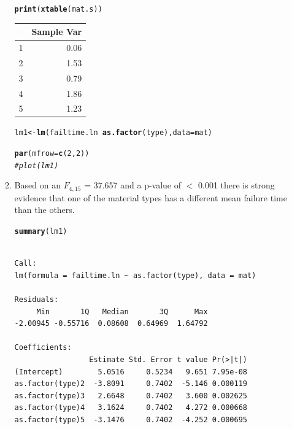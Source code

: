 \documentclass{article}\usepackage[]{graphicx}\usepackage[]{color}
\makeatletter
\newcommand{\hlnum}[1]{\textcolor[rgb]{0.686,0.059,0.569}{#1}}%
\newcommand{\hlcom}[1]{\textcolor[rgb]{0.678,0.584,0.686}{\textit{#1}}}%
\newcommand{\hlopt}[1]{\textcolor[rgb]{0,0,0}{#1}}%
\newcommand{\hlstd}[1]{\textcolor[rgb]{0.345,0.345,0.345}{#1}}%
\newcommand{\hlkwb}[1]{\textcolor[rgb]{0.69,0.353,0.396}{#1}}%
\newcommand{\hlkwc}[1]{\textcolor[rgb]{0.333,0.667,0.333}{#1}}%
\newcommand{\hlkwd}[1]{\textcolor[rgb]{0.737,0.353,0.396}{\textbf{#1}}}%
\newenvironment{kframe}{%
 \def\at@end@of@kframe{}%
 \ifinner\ifhmode%
  \def\at@end@of@kframe{\end{minipage}}%
  \begin{minipage}{\columnwidth}%
 \fi\fi%
 \def\FrameCommand##1{\hskip\@totalleftmargin \hskip-\fboxsep
 \colorbox{shadecolor}{##1}\hskip-\fboxsep
     \hskip-\linewidth \hskip-\@totalleftmargin \hskip\columnwidth}%
 \MakeFramed {\advance\hsize-\width
   \@totalleftmargin\z@ \linewidth\hsize
   \@setminipage}}%
 {\par\unskip\endMakeFramed%
 \at@end@of@kframe}
\newenvironment{knitrout}{}{} %
\makeatother
\begin{document}
\begin{enumerate}
\begin{enumerate}
\begin{kframe}
\begin{alltt}
\hlkwd{print}\hlstd{(}\hlkwd{xtable}\hlstd{(mat.s))}
\end{alltt}
\end{kframe}%
\begin{table}[ht]
\centering
\begin{tabular}{rr}
  \hline
 & Sample Var \\ 
  \hline
1 & 0.06 \\ 
  2 & 1.53 \\ 
  3 & 0.79 \\ 
  4 & 1.86 \\ 
  5 & 1.23 \\ 
   \hline
\end{tabular}
\end{table}
\begin{kframe}\begin{alltt}
\hlstd{lm1} \hlkwb{<-} \hlkwd{lm}\hlstd{(failtime.ln}\hlopt{~}\hlkwd{as.factor}\hlstd{(type),} \hlkwc{data} \hlstd{= mat)}

\hlkwd{par}\hlstd{(}\hlkwc{mfrow}\hlstd{=}\hlkwd{c}\hlstd{(}\hlnum{2}\hlstd{,}\hlnum{2}\hlstd{))}
\hlcom{#plot(lm1)}
\end{alltt}
\end{kframe}



\item %

Based on an $F_{4,15}$ = 37.657 and a p-value of $<$ 0.001 there is strong evidence that one of the material types has a different mean failure time than the others.
\begin{knitrout}\footnotesize
{}\color{fgcolor}\begin{kframe}
\begin{alltt}
\hlkwd{summary}\hlstd{(lm1)}
\end{alltt}
\begin{verbatim}

Call:
lm(formula = failtime.ln ~ as.factor(type), data = mat)

Residuals:
     Min       1Q   Median       3Q      Max 
-2.00945 -0.55716  0.08608  0.64969  1.64792 

Coefficients:
                 Estimate Std. Error t value Pr(>|t|)
(Intercept)        5.0516     0.5234   9.651 7.95e-08
as.factor(type)2  -3.8091     0.7402  -5.146 0.000119
as.factor(type)3   2.6648     0.7402   3.600 0.002625
as.factor(type)4   3.1624     0.7402   4.272 0.000668
as.factor(type)5  -3.1476     0.7402  -4.252 0.000695


\end{verbatim}
\end{kframe}
\end{knitrout}
\end{enumerate}
\end{enumerate}
\end{document}
